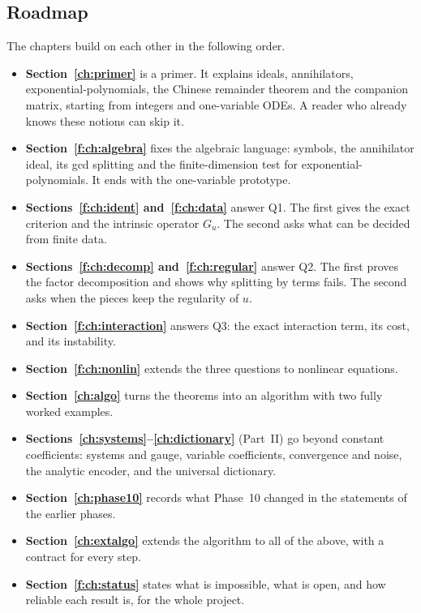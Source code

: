 \subsection{Roadmap}

The chapters build on each other in the following order.
\begin{itemize}
\item \textbf{Section~\ref{ch:primer}} is a primer. It explains ideals, annihilators, exponential-polynomials, the Chinese remainder theorem and the companion matrix, starting from integers and one-variable ODEs. A reader who already knows these notions can skip it.
\item \textbf{Section~\ref{f:ch:algebra}} fixes the algebraic language: symbols, the annihilator ideal, its gcd splitting and the finite-dimension test for exponential-polynomials. It ends with the one-variable prototype.
\item \textbf{Sections~\ref{f:ch:ident} and~\ref{f:ch:data}} answer Q1. The first gives the exact criterion and the intrinsic operator $G_u$. The second asks what can be decided from finite data.
\item \textbf{Sections~\ref{f:ch:decomp} and~\ref{f:ch:regular}} answer Q2. The first proves the factor decomposition and shows why splitting by terms fails. The second asks when the pieces keep the regularity of $u$.
\item \textbf{Section~\ref{f:ch:interaction}} answers Q3: the exact interaction term, its cost, and its instability.
\item \textbf{Section~\ref{f:ch:nonlin}} extends the three questions to nonlinear equations.
\item \textbf{Section~\ref{ch:algo}} turns the theorems into an algorithm with two fully worked examples.
\item \textbf{Sections~\ref{ch:systems}--\ref{ch:dictionary}} (Part~II) go beyond constant coefficients: systems and gauge, variable coefficients, convergence and noise, the analytic encoder, and the universal dictionary.
\item \textbf{Section~\ref{ch:phase10}} records what Phase~10 changed in the statements of the earlier phases.
\item \textbf{Section~\ref{ch:extalgo}} extends the algorithm to all of the above, with a contract for every step.
\item \textbf{Section~\ref{f:ch:status}} states what is impossible, what is open, and how reliable each result is, for the whole project.
\end{itemize}

